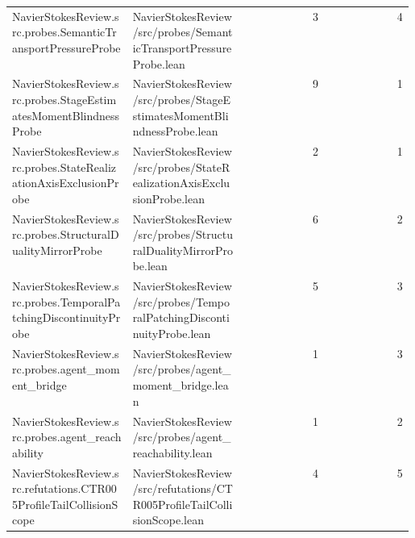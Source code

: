 \begin{longtable}{p{0.30\linewidth}p{0.28\linewidth}rr}
NavierStokesReview.src.probes.SemanticTransportPressureProbe & NavierStokesReview/src/probes/SemanticTransportPressureProbe.lean & 3 & 4\\
NavierStokesReview.src.probes.StageEstimatesMomentBlindnessProbe & NavierStokesReview/src/probes/StageEstimatesMomentBlindnessProbe.lean & 9 & 1\\
NavierStokesReview.src.probes.StateRealizationAxisExclusionProbe & NavierStokesReview/src/probes/StateRealizationAxisExclusionProbe.lean & 2 & 1\\
NavierStokesReview.src.probes.StructuralDualityMirrorProbe & NavierStokesReview/src/probes/StructuralDualityMirrorProbe.lean & 6 & 2\\
NavierStokesReview.src.probes.TemporalPatchingDiscontinuityProbe & NavierStokesReview/src/probes/TemporalPatchingDiscontinuityProbe.lean & 5 & 3\\
NavierStokesReview.src.probes.agent\_moment\_bridge & NavierStokesReview/src/probes/agent\_moment\_bridge.lean & 1 & 3\\
NavierStokesReview.src.probes.agent\_reachability & NavierStokesReview/src/probes/agent\_reachability.lean & 1 & 2\\
NavierStokesReview.src.refutations.CTR005ProfileTailCollisionScope & NavierStokesReview/src/refutations/CTR005ProfileTailCollisionScope.lean & 4 & 5\\
\end{longtable}
